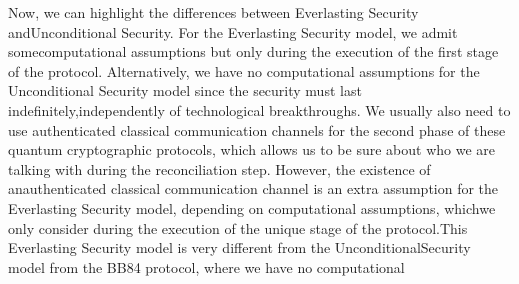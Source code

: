 \documentclass[12pt]{article}
\begin{document}
    \noindent Now, we can highlight the differences between Everlasting Security and\break Unconditional Security. For the Everlasting Security model, we admit some\break computational assumptions but only during the execution of the first stage of the protocol. Alternatively, we have no computational assumptions for the Unconditional Security model since the security must last indefinitely,\break independently of technological breakthroughs. We usually also need to use authenticated classical communication channels for the second phase of these quantum cryptographic protocols, which allows us to be sure about who we are talking with during the reconciliation step. However, the existence of an\break authenticated classical communication channel is an extra assumption for the Everlasting Security model, depending on computational assumptions, which\break we only consider during the execution of the unique stage of the protocol.\break This Everlasting Security model is very different from the Unconditional\break Security model from the BB84 protocol, where we have no computational\break
\end{document}

